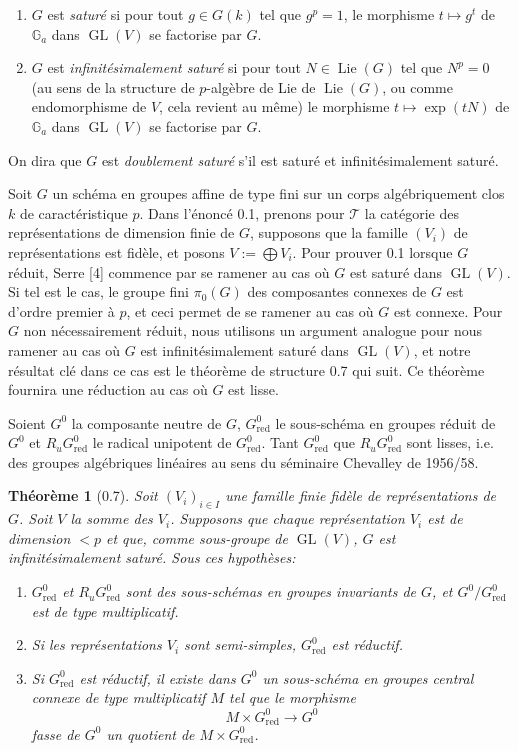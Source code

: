 \documentclass[10pt]{article}
\newcommand{\Ga}{\mathbb G_a}
\newcommand{\GL}{\operatorname{GL}}
\newcommand{\Lie}{\operatorname{Lie}}
\newcommand{\Ru}{R_u}
\newcommand{\red}{\mathrm{red}}
\newcommand{\T}{\mathcal T}
\theoremstyle{deligne}
\newtheorem*{theorem*}{Théorème}
\newcommand{\heading}[1]{\vspace{0.7em}\noindent{\bfseries #1}\quad}
\begin{document}
\begin{enumerate}[label=(\roman*)]
\item \(G\) est \emph{saturé} si pour tout \(g\in G(k)\) tel que \(g^p=1\), le morphisme \(t\mapsto g^t\) de \(\Ga\) dans \(\GL(V)\) se factorise par \(G\).
\item \(G\) est \emph{infinitésimalement saturé} si pour tout \(N\in\Lie(G)\) tel que \(N^p=0\) (au sens de la structure de \(p\)-algèbre de Lie de \(\Lie(G)\), ou comme endomorphisme de \(V\), cela revient au même) le morphisme \(t\mapsto\exp(tN)\) de \(\Ga\) dans \(\GL(V)\) se factorise par \(G\).
\end{enumerate}
On dira que \(G\) est \emph{doublement saturé} s'il est saturé et infinitésimalement saturé.

\heading{0.6.} Soit \(G\) un schéma en groupes affine de type fini sur un corps algébriquement clos \(k\) de caractéristique \(p\). Dans l'énoncé 0.1, prenons pour \(\T\) la catégorie des représentations de dimension finie de \(G\), supposons que la famille \((V_i)\) de représentations est fidèle, et posons \(V:=\bigoplus V_i\). Pour prouver 0.1 lorsque \(G\) réduit, Serre [4] commence par se ramener au cas où \(G\) est saturé dans \(\GL(V)\). Si tel est le cas, le groupe fini \(\pi_0(G)\) des composantes connexes de \(G\) est d'ordre premier à \(p\), et ceci permet de se ramener au cas où \(G\) est connexe. Pour \(G\) non nécessairement réduit, nous utilisons un argument analogue pour nous ramener au cas où \(G\) est infinitésimalement saturé dans \(\GL(V)\), et notre résultat clé dans ce cas est le théorème de structure 0.7 qui suit. Ce théorème fournira une réduction au cas où \(G\) est lisse.

Soient \(G^0\) la composante neutre de \(G\), \(G^0_{\red}\) le sous-schéma en groupes réduit de \(G^0\) et \(\Ru G^0_{\red}\) le radical unipotent de \(G^0_{\red}\). Tant \(G^0_{\red}\) que \(\Ru G^0_{\red}\) sont lisses, i.e. des groupes algébriques linéaires au sens du séminaire Chevalley de 1956/58.

\begin{theorem*}[0.7]
Soit \((V_i)_{i\in I}\) une famille finie fidèle de représentations de \(G\). Soit \(V\) la somme des \(V_i\). Supposons que chaque représentation \(V_i\) est de dimension \(<p\) et que, comme sous-groupe de \(\GL(V)\), \(G\) est infinitésimalement saturé. Sous ces hypothèses:
\begin{enumerate}[label=(\roman*)]
\item \(G^0_{\red}\) et \(\Ru G^0_{\red}\) sont des sous-schémas en groupes invariants de \(G\), et \(G^0/G^0_{\red}\) est de type multiplicatif.
\item Si les représentations \(V_i\) sont semi-simples, \(G^0_{\red}\) est réductif.
\item Si \(G^0_{\red}\) est réductif, il existe dans \(G^0\) un sous-schéma en groupes central connexe de type multiplicatif \(M\) tel que le morphisme
\[
  M\times G^0_{\red}\longrightarrow G^0
\]
fasse de \(G^0\) un quotient de \(M\times G^0_{\red}\).
\end{enumerate}
\end{theorem*}
\end{document}
